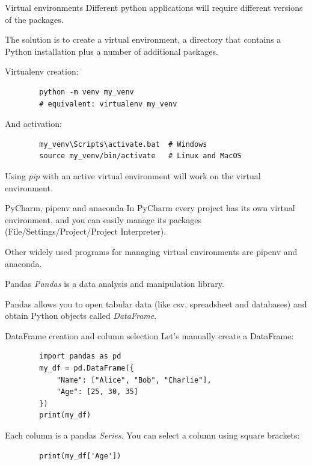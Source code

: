 \documentclass[aspectratio=169,handout]{beamer}
\begin{document}
\begin{frame}[fragile]{Virtual environments}
    Different python applications will require different versions of the packages.

    The solution is to create a virtual environment, a directory that contains a
    Python installation plus a number of additional packages.

    Virtualenv creation:
    \begin{verbatim}
        python -m venv my_venv
        # equivalent: virtualenv my_venv
    \end{verbatim}

    And activation:
    \begin{verbatim}
        my_venv\Scripts\activate.bat  # Windows
        source my_venv/bin/activate   # Linux and MacOS
    \end{verbatim}

    Using \emph{pip} with an active virtual environment will work on the virtual environment.
\end{frame}

\begin{frame}{PyCharm, pipenv and anaconda}
    In PyCharm every project has its own virtual environment, and you can easily manage its packages
    (File/Settings/Project/Project Interpreter).

    Other widely used programs for managing virtual environments are pipenv and anaconda.
\end{frame}

\begin{frame}{Pandas}
    \emph{Pandas} is a data analysis and manipulation library.

    Pandas allows you to open tabular data (like csv, spreadsheet and databases) and obtain Python objects called
    \emph{DataFrame}.

    \begin{figure}
        \centering
        \def\svgwidth{\textwidth}
        
    \end{figure}
\end{frame}

\begin{frame}[fragile]{DataFrame creation and column selection}
    Let's manually create a DataFrame:
    \begin{verbatim}
        import pandas as pd
        my_df = pd.DataFrame({
            "Name": ["Alice", "Bob", "Charlie"],
            "Age": [25, 30, 35]
        })
        print(my_df)
    \end{verbatim}

    \pause
    Each column is a pandas \emph{Series}.
    You can select a column using square brackets:
    \begin{verbatim}
        print(my_df['Age'])
    \end{verbatim}
\end{frame}
\end{document}

